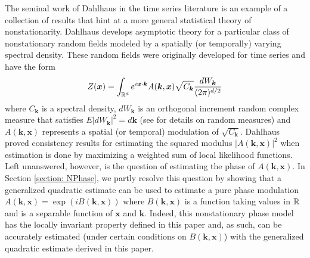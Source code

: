 \documentclass[10pt,noinfoline]{imsart}
\newcommand{\bs}{\boldsymbol}
\begin{document}
The seminal work of Dahlhaus in the time series literature \cite{dahlhaus1997fitting,dahlhaus2000likelihood}  is  an example of a collection of results that hint at a more general statistical theory of nonstationarity.  Dahlhaus develops asymptotic theory for a particular class of nonstationary random fields modeled by a spatially (or temporally) varying spectral density. These random fields were originally developed for time series \cite{priestley1965evolutionary,priestley1981spectral} and have the form 
\begin{align}
\label{eq: intro nonstat phase model}
Z(\bs x)= \int_{\Bbb R^d} e^{i\bs x\cdot \bs k} A(\bs k, \bs x)\sqrt{C_{\bs k}}\frac{dW_{\bs k}}{(2\pi)^{d/2}}
\end{align} 
where  $C_{\bs k}$ is a spectral density, $dW_{\bs k}$ is an orthogonal increment random complex measure that satisfies $E|dW_{\bs k}|^2 =  d{\bs k}$ (see \cite{Gikhman_Skorokhod_book_v1} for details on random measures) and $A({\bs k},{\bs x})$ represents a spatial (or temporal) modulation of $\sqrt{C_{\bs k}}$. 
Dahlhaus proved consistency results for estimating the squared modulus $|A({\bs k},{\bs x})|^2$ when estimation is done  by maximizing a weighted sum of local likelihood functions. Left unanswered, however, is the question of estimating the phase of $A({\bs k},{\bs x})$. In Section \ref{section: NPhase}, we partly resolve this question by showing that a generalized quadratic estimate can be used to estimate a pure phase modulation $A({\bs k},{\bs x})=\exp({iB(\bs k,\bs x)})$ where $B(\bs k,\bs x)$ is a function taking values in $\Bbb R$ and is a separable function of $\bs x$ and $\bs k$. Indeed, this nonstationary phase model has the locally invariant property defined in this paper and, as such, can be accurately estimated (under certain conditions on $B(\bs k,\bs x)$) with the generalized quadratic estimate derived in this paper.  
\end{document}
